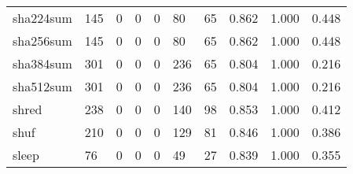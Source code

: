 \begin{longtable}{lp{1.3cm}p{1.3cm}p{1.3cm}p{1.3cm}p{1.3cm}p{1.3cm}p{1.3cm}p{1.3cm}p{1.3cm}}
sha224sum &                    145 &                                             0 &                                            0 &                                           0 &                                           80 &                                         65 &                                0.862 &                                  1.000 &                                0.448 \\
sha256sum &                    145 &                                             0 &                                            0 &                                           0 &                                           80 &                                         65 &                                0.862 &                                  1.000 &                                0.448 \\
sha384sum &                    301 &                                             0 &                                            0 &                                           0 &                                          236 &                                         65 &                                0.804 &                                  1.000 &                                0.216 \\
sha512sum &                    301 &                                             0 &                                            0 &                                           0 &                                          236 &                                         65 &                                0.804 &                                  1.000 &                                0.216 \\
shred     &                    238 &                                             0 &                                            0 &                                           0 &                                          140 &                                         98 &                                0.853 &                                  1.000 &                                0.412 \\
shuf      &                    210 &                                             0 &                                            0 &                                           0 &                                          129 &                                         81 &                                0.846 &                                  1.000 &                                0.386 \\
sleep     &                     76 &                                             0 &                                            0 &                                           0 &                                           49 &                                         27 &                                0.839 &                                  1.000 &                                0.355 \\

\end{longtable}
